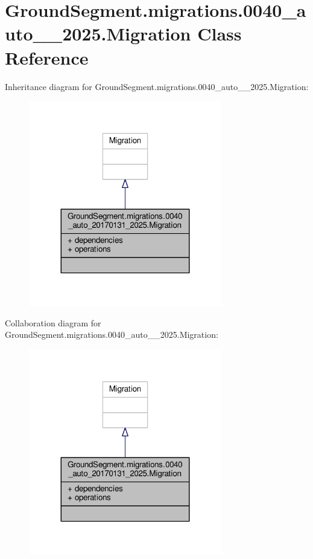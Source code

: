 \hypertarget{class_ground_segment_1_1migrations_1_10040__auto__20170131__2025_1_1_migration}{}\section{Ground\+Segment.\+migrations.0040\+\_\+auto\+\_\+\_\+2025.Migration Class Reference}
\label{class_ground_segment_1_1migrations_1_10040__auto__20170131__2025_1_1_migration}


Inheritance diagram for Ground\+Segment.\+migrations.0040\+\_\+auto\+\_\+\_\+2025.Migration\+:\nopagebreak
\begin{figure}[H]
\begin{center}
\leavevmode
\includegraphics[width=239pt]{class_ground_segment_1_1migrations_1_10040__auto__20170131__2025_1_1_migration__inherit__graph}
\end{center}
\end{figure}


Collaboration diagram for Ground\+Segment.\+migrations.0040\+\_\+auto\+\_\+\_\+2025.Migration\+:\nopagebreak
\begin{figure}[H]
\begin{center}
\leavevmode
\includegraphics[width=239pt]{class_ground_segment_1_1migrations_1_10040__auto__20170131__2025_1_1_migration__coll__graph}
\end{center}
\end{figure}
